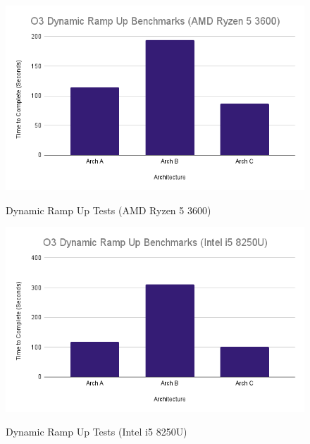 \documentclass{article}
\begin{document}
\begin{figure}[!h]
\centering
\includegraphics[scale=0.5]{O3 Dynamic Ramp Up Benchmarks (AMD Ryzen 5 3600).png}
\label{pc_dynamic_ramp_up_tests}
\caption{Dynamic Ramp Up Tests (AMD Ryzen 5 3600)}
\end{figure}

\begin{figure}[!h]
\centering
\includegraphics[scale=0.5]{O3 Dynamic Ramp Up Benchmarks (Intel i5 8250U).png}
\label{lapotp_dynamic_ramp_up_tests}
\caption{Dynamic Ramp Up Tests (Intel i5 8250U)}
\end{figure}

\clearpage
\end{document}
